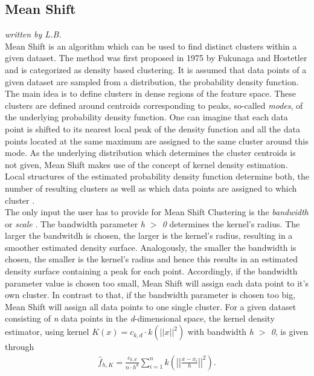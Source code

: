 \subsection{Mean Shift}
\textit{written by L.B.}\\

Mean Shift is an algorithm which can be used to find distinct clusters within a given dataset. 
The method was first proposed in 1975 by Fukunaga and Hostetler \cite{fukunaga1975estimation} and is categorized as density based clustering.
It is assumed that data points of a given dataset are sampled from a distribution, the probability density function. The main idea is to define clusters in dense regions of the feature space. These clusters are defined around centroids corresponding to peaks, so-called \textit{modes}, of the underlying probability density function. One can imagine that each data point is shifted to its nearest local peak of the density function and all the data points located at the same maximum are assigned to the same cluster around this mode. As the underlying distribution which determines the cluster centroids is not given, Mean Shift makes use of the concept of kernel density estimation. Local structures of the estimated probability density function determine both, the number of resulting clusters as well as which data points are assigned to which cluster \cite{comaniciu2002MeanShift}.  \\
The only input the user has to provide for Mean Shift Clustering is the \textit{bandwidth} or \textit{scale} \cite{scikit-learn}. The bandwidth parameter \textit{h $>$ 0} determines the kernel's radius. The larger the bandwitdh is chosen, the larger is the kernel's radius, resulting in a smoother estimated density surface. Analogously, the smaller the bandwidth is chosen, the smaller is the kernel's radius and hence this results in an estimated density surface containing a peak for each point.
Accordingly, if the bandwidth parameter value is chosen too small, Mean Shift will assign each data point to it's own cluster. In contrast to that, if the bandwidth parameter is chosen too big, Mean Shift will assign all data points to one single cluster.  
For a given dataset consisting of \textit{n} data points in the \textit{d}-dimensional space, the kernel density estimator, using kernel $K(x)=c_{k, d} \cdot k \left( ||x||^{2} \right)$ with bandwidth \textit{h $>$ 0}, is given through\\
\begin{align*}
	\hat{f}_{h, K} = \frac{c_{k, d}}{n \cdot h^{d}} \sum_{i=1}^{n} k \left( \left|\left|\frac{x - x_{i}}{h} \right|\right|^{2}\right).
\end{align*}
